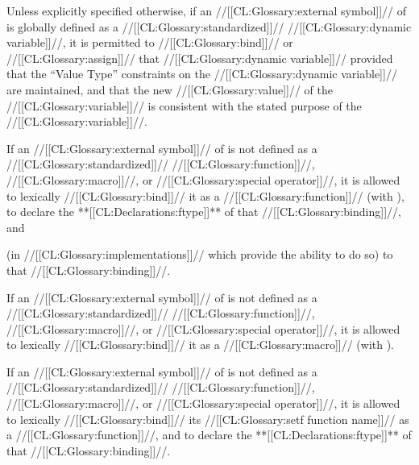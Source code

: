 Unless explicitly specified otherwise, if an //[[CL:Glossary:external symbol]]// of   is globally defined as a //[[CL:Glossary:standardized]]// //[[CL:Glossary:dynamic variable]]//, it is permitted to //[[CL:Glossary:bind]]// or //[[CL:Glossary:assign]]// that //[[CL:Glossary:dynamic variable]]// provided that the ``Value Type'' constraints on the //[[CL:Glossary:dynamic variable]]//  are maintained, and that the new //[[CL:Glossary:value]]// of the //[[CL:Glossary:variable]]//  is consistent with the stated purpose of the //[[CL:Glossary:variable]]//.

If an //[[CL:Glossary:external symbol]]// of  is not defined as a //[[CL:Glossary:standardized]]// //[[CL:Glossary:function]]//, //[[CL:Glossary:macro]]//, or //[[CL:Glossary:special operator]]//, it is allowed to lexically //[[CL:Glossary:bind]]// it as a //[[CL:Glossary:function]]// (\eg with ),
              to declare the **[[CL:Declarations:ftype]]** of that //[[CL:Glossary:binding]]//, 
          and 

              (in //[[CL:Glossary:implementations]]// which provide the ability to do so) 	      to  that //[[CL:Glossary:binding]]//.

If an //[[CL:Glossary:external symbol]]// of  is not defined as a //[[CL:Glossary:standardized]]// //[[CL:Glossary:function]]//, //[[CL:Glossary:macro]]//, or //[[CL:Glossary:special operator]]//, it is allowed to lexically //[[CL:Glossary:bind]]// it as a //[[CL:Glossary:macro]]// (\eg with ).

 If an //[[CL:Glossary:external symbol]]// of  is not defined  as a //[[CL:Glossary:standardized]]// //[[CL:Glossary:function]]//, //[[CL:Glossary:macro]]//, or //[[CL:Glossary:special operator]]//, it is allowed to lexically //[[CL:Glossary:bind]]// its //[[CL:Glossary:setf function name]]// as a //[[CL:Glossary:function]]//, and to declare the **[[CL:Declarations:ftype]]** of that //[[CL:Glossary:binding]]//.

\endsubsubsubsubsection%

\endsubsubsubsection%

\endsubsubsection%

 

